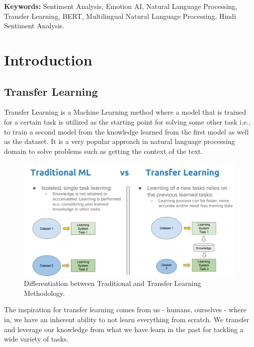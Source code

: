 \documentclass[a4paper, 12pt]{article}
\begin{document}
\begin{sloppypar}
\textbf{Keywords:} Sentiment Analysis, Emotion AI,  Natural Language Processing, Transfer Learning, BERT, Multilingual Natural Language Processing, Hindi Sentiment Analysis.
\thispagestyle{empty}
\clearpage
\tableofcontents
\thispagestyle{empty}
\clearpage
\setcounter{page}{1}
\section{Introduction}

\subsection{Transfer Learning}
Transfer Learning is a Machine Learning method where a model that is trained for a certain task is utilized as the starting point for solving some other task i.e., to train a second model from the knowledge learned from the first model as well as the dataset. It is a very popular approach in natural language processing domain to solve problems such as getting the context of the text.

\begin{figure}[H]
\begin{center}
\includegraphics[scale=0.45]{tl.png}
\caption{Differentiation between Traditional and Transfer Learning Methodology. \cite{noauthor_guide_2019} \label{tl}}
\end{center}
\end{figure}

The inspiration for transfer learning comes from us - humans, ourselves - where in, we have an inherent ability to not learn everything from scratch. We transfer and leverage our knowledge from what we have learn in the past for tackling a wide variety of tasks.\cite{sarkar_deep_2018}


\end{sloppypar}
\end{document}
